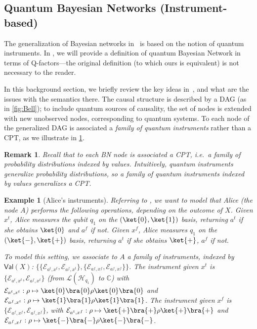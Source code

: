 \documentclass[10pt,a4paper]{article}
\newcommand*{\ie}{\emph{i.e.}\xspace}
\newcommand{\Val}[1]{\mathsf{Val}(#1)}
\renewcommand{\L}{\mathcal{L}}
\newcommand{\Eop}{\mathcal E}
\newcommand*{\C}{\mathbb{C}}
\newcommand{\HH}{\mathcal{H}}
\newcommand{\M}{\rho}
\newcommand*{\qfactor}{Q-factor}
\newtheorem{example}[theorem]{Example}
\newtheorem{remark}[theorem]{Remark}
\begin{document}
\subsection{Quantum Bayesian Networks (Instrument-based)}
\label{sec:qbn_instrument}

The generalization of Bayesian networks in~\cite{GBN2014} is based on the notion of quantum instruments. In , we will provide a definition of quantum Bayesian Network in terms of \qfactor s---the original definition (to which ours is equivalent) is not necessary to the reader. 

In this background section, we briefly review the key ideas in~\cite{GBN2014}, and what are the issues with the semantics there. 
The causal structure is described by a DAG (as in \cref{fig:Bell}); to include quantum sources of causality, the set of nodes is extended with new unobserved nodes, corresponding to quantum systems.
To each node of the generalized DAG is associated a \emph{family of quantum instruments} rather than a CPT, as we illustrate in \cref{ex:Alice_instrument}.

\begin{remark}
Recall that to each BN node is associated a CPT, \ie\ a \emph{family of probability distributions} indexed by values.
Intuitively, quantum instruments generalize probability distributions, so a \emph{family of quantum instruments} indexed by values generalizes a CPT.
\end{remark}

\begin{example}[Alice's instruments]
\label{ex:Alice_instrument}
Referring to , we want to model that Alice (the node $A$) performs the following operations, depending on the outcome of $X$.
Given $x^t$, Alice measures the qubit $q_1$ on the $(\ket{0},\ket{1})$ basis, returning $a^t$ if she obtains $\ket{0}$ and $a^f$ if not.
Given $x^f$, Alice measures $q_1$ on the $(\ket{-},\ket{+})$ basis, returning $a^t$ if she obtains $\ket{+}$, $a^f$ if not.

To model this setting, we associate to $A$ a \emph{family} of instruments, indexed by $\Val{X}$: $\{\{\Eop_{a^t,x^t},\Eop_{a^f,x^t}\},\{\Eop_{a^f,x^f},\Eop_{a^f,x^f}\}\}$.
The instrument given $x^t$ is $\{\Eop_{a^t,x^t},\Eop_{a^f,x^t}\}$ (from $\L(\HH_{q_1})$ to $\C$) with $\Eop_{a^t,x^t} : \M \mapsto \ket{0}\bra{0}\M\ket{0}\bra{0}$ and $\Eop_{a^f,x^t}: \M \mapsto \ket{1}\bra{1}\M\ket{1}\bra{1}$.
The instrument given $x^f$ is $\{\Eop_{a^f,x^f},\Eop_{a^f,x^f}\}$, %
with $\Eop_{a^t,x^f} : \M \mapsto \ket{+}\bra{+}\M\ket{+}\bra{+}$ and $\Eop_{a^f,x^f}: \M \mapsto \ket{-}\bra{-}\M\ket{-}\bra{-}$.
\end{example}
\end{document}
